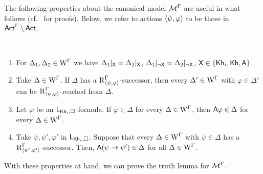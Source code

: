 
The following properties about the canonical model $\mathcal{M}^\Gamma$ are useful in what follows (cf.~\cite{Wang2016,AFSVQ23report} for proofs). Below, we refer to actions $\langle \psi,\varphi \rangle$ to be those in ${\rm \sf Act}^\Gamma\setminus{\rm \sf Act}$.

\medskip

\begin{proposition} \label{pro:canonical}\ 
	\begin{enumerate}
		\item \label{pro:cm-ults-khiml-allsame}
For $\Delta_1, \Delta_2 \in \operatorname{W}^\Gamma$ we have $\Delta_1|_{{\mathsf{X}}} = \Delta_2|_{{\mathsf{X}}}$, $\Delta_1|_{\lnot{\mathsf{X}}} = \Delta_2|_{\lnot{\mathsf{X}}}$, ${\mathsf{X}} \in \{ {\sf Kh}_i,{\sf Kh},{\sf A} \}$.

\item\label{pro:cm-ults-khiml-oneall}
Take $\Delta \in \operatorname{W}^\Gamma$. If $\Delta$ has a $\operatorname{R}^\Gamma_{\langle \psi,\varphi \rangle}$-successor, then every $\Delta' \in \operatorname{W}^\Gamma$ with $\varphi \in \Delta'$ can be $\operatorname{R}^\Gamma_{\langle \psi,\varphi \rangle}$-reached from $\Delta$.

\item \label{pro:cm-ults-khiml-allall}
Let $\varphi$ be an $\mathsf{L}_{{\sf Kh}_i,\square}$-formula. If $\varphi \in \Delta$ for every $\Delta \in \operatorname{W}^\Gamma$, then ${\sf A}\varphi \in \Delta$ for every $\Delta \in \operatorname{W}^\Gamma$.

\item\label{pro:cm-ults-khiml-succpre}
Take $\psi, \psi', \varphi'$ in $\mathsf{L}_{{\sf Kh}_i,\square}$. Suppose that every $\Delta \in \operatorname{W}^\Gamma$ with $\psi \in \Delta$ has a $\operatorname{R}^{\Gamma}_{\langle \psi',\varphi' \rangle}$-successor. Then, ${\sf A}(\psi \rightarrow \psi') \in \Delta$ for all $\Delta \in \operatorname{W}^\Gamma$.
	\end{enumerate}
\end{proposition}

\medskip

With these properties at hand, we can prove the truth lemma for $\mathcal{M}^\Gamma$.

\medskip

